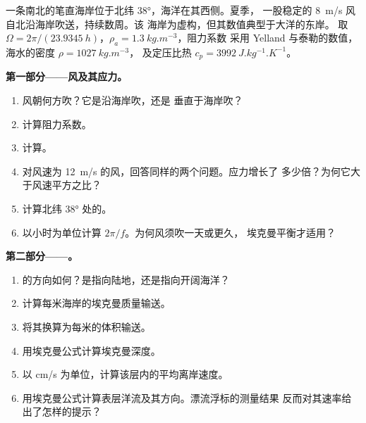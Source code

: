 \begin{problem}
\label{pb:b1:ocean-circulation:1}
一条南北的笔直海岸位于北纬 \ang{38}，海洋在其西侧。夏季，
一股稳定的 \qty{8}{m/s} 风自北沿海岸吹送，持续数周。该
海岸为虚构，但其数值典型于大洋的东岸。
取 $\Omega = 2\pi/(\qty{23.9345}{h})$，$\rho_a = \qty{1.3}{kg.m^{-3}}$，阻力系数
采用 Yelland 与泰勒的数值，海水的密度 $\rho = \qty{1027}{kg.m^{-3}}$，
及定压比热 $c_p = \qty{3992}{J.kg^{-1}.K^{-1}}$。

\medskip
\noindent\textbf{第一部分——风及其应力。}
\begin{enumerate}
  \item 风朝何方吹？它是沿海岸吹，还是
        垂直于海岸吹？
  \item 计算阻力系数。
  \item 计算。
  \item 对风速为 \qty{12}{m/s} 的风，回答同样的两个问题。应力增长了
        多少倍？为何它大于风速平方之比？
  \item 计算北纬 \ang{38} 处的。
  \item 以小时为单位计算 $2\pi/f$。为何风须吹一天或更久，
        埃克曼平衡才适用？
\end{enumerate}

\medskip
\noindent\textbf{第二部分——。}
\begin{enumerate}[resume]
  \item {}的方向如何？是指向陆地，还是指向开阔海洋？
  \item 计算每米海岸的埃克曼质量输送。
  \item 将其换算为每米的体积输送。
  \item 用埃克曼公式计算埃克曼深度。
  \item 以 \unit{cm/s} 为单位，计算该层内的平均离岸速度。
  \item 用埃克曼公式计算表层洋流及其方向。漂流浮标的测量结果
        反而对其速率给出了怎样的提示？
\end{enumerate}


\end{problem}
